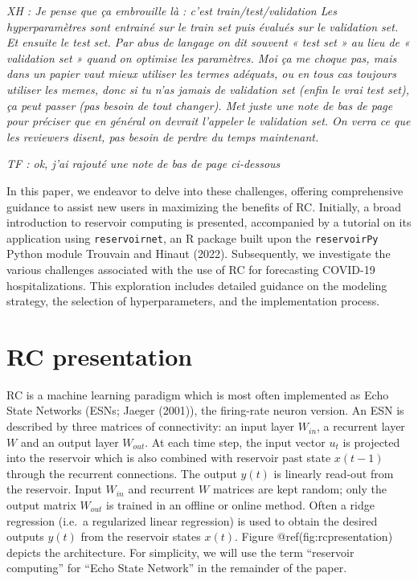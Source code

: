 \documentclass[
  11pt,
  a4paper,
]{article}
\theoremstyle{plain}
\theoremstyle{remark}
\begin{document}
\emph{XH : Je pense que ça embrouille là : c'est train/test/validation
Les hyperparamètres sont entrainé sur le train set puis évalués sur le
validation set. Et ensuite le test set. Par abus de langage on dit
souvent « test set » au lieu de « validation set » quand on optimise les
paramètres. Moi ça me choque pas, mais dans un papier vaut mieux
utiliser les termes adéquats, ou en tous cas toujours utiliser les
memes, donc si tu n'as jamais de validation set (enfin le vrai test
set), ça peut passer (pas besoin de tout changer). Met juste une note de
bas de page pour préciser que en général on devrait l'appeler le
validation set. On verra ce que les reviewers disent, pas besoin de
perdre du temps maintenant.}

\emph{TF : ok, j'ai rajouté une note de bas de page ci-dessous}

In this paper, we endeavor to delve into these challenges, offering
comprehensive guidance to assist new users in maximizing the benefits of
RC. Initially, a broad introduction to reservoir computing is presented,
accompanied by a tutorial on its application using
\texttt{reservoirnet}, an R package built upon the \texttt{reservoirPy}
Python module Trouvain and Hinaut (2022). Subsequently, we investigate
the various challenges associated with the use of RC for forecasting
COVID-19 hospitalizations. This exploration includes detailed guidance
on the modeling strategy, the selection of hyperparameters, and the
implementation process.

\section{RC presentation}\label{rc-presentation}

RC is a machine learning paradigm which is most often implemented as
Echo State Networks (ESNs; Jaeger (2001)), the firing-rate neuron
version. An ESN is described by three matrices of connectivity: an input
layer \(W_{in}\), a recurrent layer \(W\) and an output layer
\(W_{out}\). At each time step, the input vector \(u_t\) is projected
into the reservoir which is also combined with reservoir past state
\(x(t-1)\) through the recurrent connections. The output \(y(t)\) is
linearly read-out from the reservoir. Input \(W_{in}\) and recurrent
\(W\) matrices are kept random; only the output matrix \(W_{out}\) is
trained in an offline or online method. Often a ridge regression (i.e.~a
regularized linear regression) is used to obtain the desired outputs
\(y(t)\) from the reservoir states \(x(t)\). Figure
@ref(fig:rcpresentation) depicts the architecture. For simplicity, we
will use the term ``reservoir computing'' for ``Echo State Network'' in
the remainder of the paper.
\end{document}

